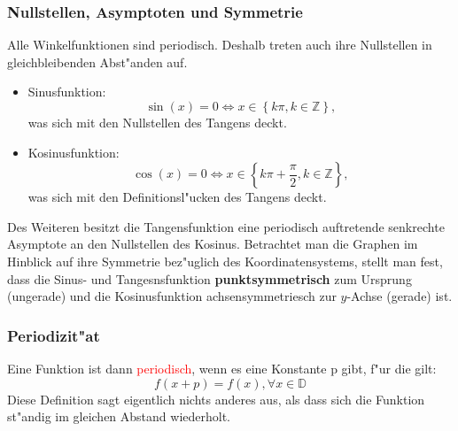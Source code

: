 \subsubsection{Nullstellen, Asymptoten und Symmetrie}
Alle Winkelfunktionen sind periodisch. Deshalb treten auch ihre Nullstellen in gleichbleibenden Abst"anden auf.
\begin{itemize}
\item Sinusfunktion:
\begin{equation*}
 \sin(x) = 0 \iff x \in \left\{ k \pi, k \in \mathbb{Z} \right\},
\end{equation*}
was sich mit den Nullstellen des Tangens deckt.
\item Kosinusfunktion: 
\begin{equation*}
 \cos(x) = 0 \iff x \in \left\{ k \pi + \frac{\pi}{2}, k \in \mathbb{Z} \right\},
\end{equation*}
was sich mit den Definitionsl"ucken des Tangens deckt.
\end{itemize}
Des Weiteren besitzt die Tangensfunktion eine periodisch auftretende senkrechte Asymptote an den Nullstellen des Kosinus.
Betrachtet man die Graphen im Hinblick auf ihre Symmetrie bez"uglich des Koordinatensystems, stellt man fest, dass die Sinus- und Tangesnsfunktion \textbf{punktsymmetrisch} zum Ursprung (ungerade) und die Kosinusfunktion achsensymmetriesch zur $y$-Achse (gerade) ist.

\subsubsection{Periodizit"at}
Eine Funktion ist dann \textcolor{red}{periodisch}, wenn es eine Konstante p gibt, f"ur die gilt:
\begin{equation*}
f(x+p) = f(x), \forall x\in\mathbb{D}
\end{equation*}
Diese Definition sagt eigentlich nichts anderes aus, als dass sich die Funktion st"andig im gleichen Abstand wiederholt.
